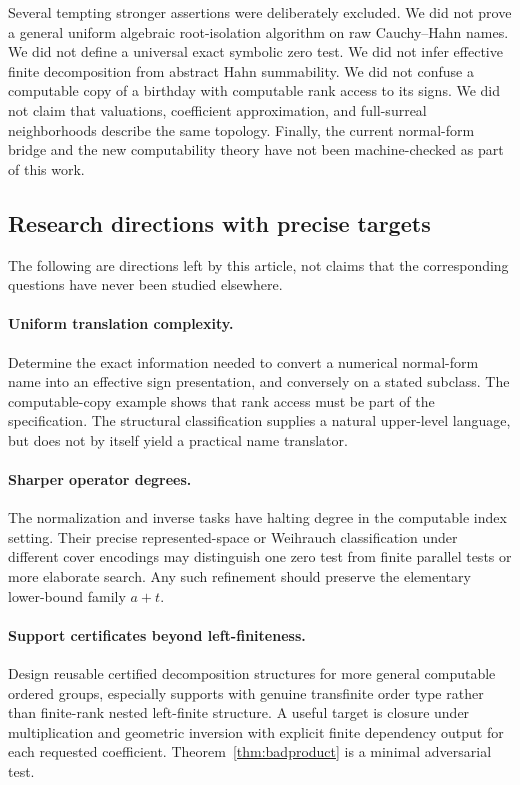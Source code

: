 \documentclass[11pt,letterpaper]{article}
\numberwithin{equation}{section}
\theoremstyle{definition}
\theoremstyle{remark}
\begin{document}
Several tempting stronger assertions were deliberately excluded. We did
not prove a general uniform algebraic root-isolation algorithm on raw
Cauchy--Hahn names. We did not define a universal exact symbolic zero test.
We did not infer effective finite decomposition from abstract Hahn
summability. We did not confuse a computable copy of a birthday with
computable rank access to its signs. We did not claim that valuations,
coefficient approximation, and full-surreal neighborhoods describe the
same topology. Finally, the current normal-form bridge and the new
computability theory have not been machine-checked as part of this work.

\subsection{Research directions with precise targets}

The following are directions left by this article, not claims that the
corresponding questions have never been studied elsewhere.

\paragraph{Uniform translation complexity.}
Determine the exact information needed to convert a numerical normal-form
name into an effective sign presentation, and conversely on a stated
subclass. The computable-copy example shows that rank access must be part
of the specification. The structural classification supplies a natural
upper-level language, but does not by itself yield a practical name
translator.

\paragraph{Sharper operator degrees.}
The normalization and inverse tasks have halting degree in the computable
index setting. Their precise represented-space or Weihrauch classification
under different cover encodings may distinguish one zero test from finite
parallel tests or more elaborate search. Any such refinement should
preserve the elementary lower-bound family $a+t$.

\paragraph{Support certificates beyond left-finiteness.}
Design reusable certified decomposition structures for more general
computable ordered groups, especially supports with genuine transfinite
order type rather than finite-rank nested left-finite structure. A useful
target is closure under multiplication and geometric inversion with
explicit finite dependency output for each requested coefficient.
Theorem~\ref{thm:badproduct} is a minimal adversarial test.
\end{document}
